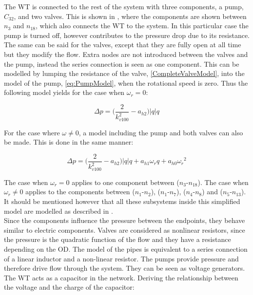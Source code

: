 The WT is connected to the rest of the system with three components, a pump, $C_{32}$, and two valves. This is shown in , where the components are shown between $n_3$ and $n_{18}$, which also connects the WT to the system. In this particular case the pump is turned off, however contributes to the pressure drop due to its resistance. The same can be said for the valves, except that they are fully open at all time but they modify the flow. Extra nodes are not introduced between the valves and the pump, instead the series connection is seen as one component. This can be modelled by lumping the resistance of the valve, \eqref{CompleteValveModel}, into the model of the pump, \eqref{eq:PumpModel}, when the rotational speed is zero. Thus the following model yields for the case when $\omega_r = 0$:

\begin{equation}
  \Delta p = \Big(\frac{2}{k_{v100}^2} - a_{h2}\Big)|q| q 
  \label{omega_zero}
\end{equation}

For the case where $\omega \neq 0$, a model including the pump and both valves can also be made. This is done in the same manner: 

\begin{equation}
  \Delta p = \Big(\frac{2}{k_{v100}^2} - a_{h2}\Big)|q| q  + a_{h1} \omega_r q + a_{h0}{\omega_r}^2
  \label{omega_notzero}
\end{equation}

The case when $\omega_r = 0$ applies to one component between ($n_3$-$n_{18}$). The case when $\omega_r \neq 0$ applies to the components between ($n_1$-$n_2$), ($n_1$-$n_7$), ($n_4$-$n_8$) and ($n_5$-$n_{13}$). It should be mentioned however that all these subsystems inside this simplified model are modelled as described in . 
\\
Since the components influence the pressure between the endpoints, they behave similar to electric components. Valves are considered as nonlinear resistors, since the pressure is the quadratic function of the flow and they have a resistance depending on the OD.
The model of the pipes is equivalent to a series connection of a linear inductor and a non-linear resistor. %
The pumps provide pressure and therefore drive flow through the system. They can be seen as voltage generators. The WT acts as a capacitor in the network. Deriving the relationship between the voltage and the charge of the capacitor:

